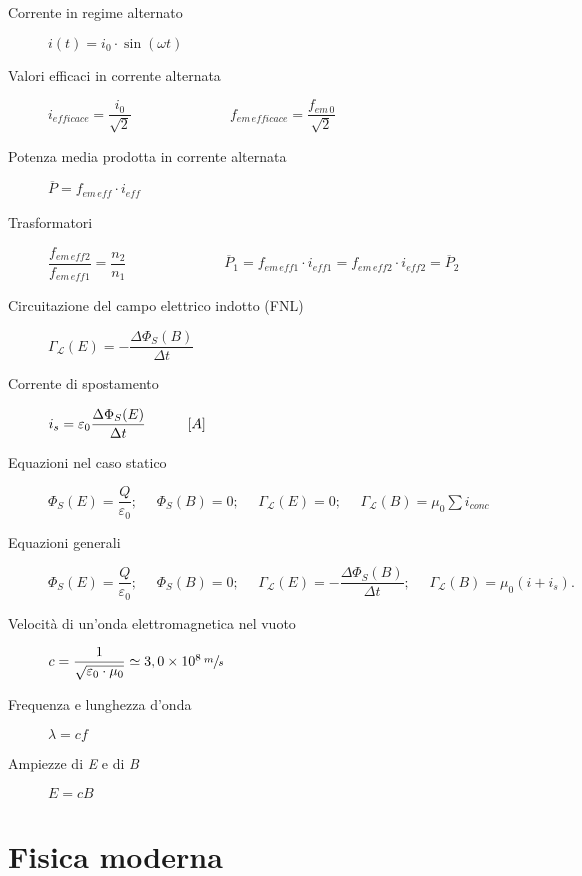 \documentclass[a4paper,11pt,italian]{article}
\begin{document}
\begin{description}
  \item[Corrente in regime alternato]
  $ i (t)  = i_0 \cdot \sin (\omega t) $
  
  \item[Valori efficaci in corrente alternata]  $ i_{\mathit{efficace}} = \dfrac{i_0}{\sqrt{2}} $~~~~~~~~~~~~~~$ f_{em \, \mathit{efficace}} = \dfrac{f_{em \, 0}}{\sqrt{2}} $
  
  \item[Potenza media prodotta in corrente alternata] 
  $ \overline{P} = f_{em \, \mathit{eff}} \cdot i_{\mathit{eff}} $
  
  \item[Trasformatori] $ \dfrac{f_{em \, \mathit{eff}2}}{f_{em \, \mathit{eff}1}} = \dfrac{n_2}{n_1} $~~~~~~~~~~~~~~$ \overline{P}_1 = f_{em \, \mathit{eff}1} \cdot i_{\mathit{eff}1} =  f_{em \, \mathit{eff}2} \cdot i_{\mathit{eff}2} = \overline{P}_2 $

  \item[Circuitazione del campo elettrico indotto (FNL)] 
  $ \Gamma_\mathscr{L}(E) = - \dfrac{\Delta \Phi_S(B)}{\Delta t}  $
  
  \item[Corrente di spostamento] 
  $ i_s = \varepsilon_0 \dfrac{\Delta \Phi_S(E)}{\Delta t} \hspace*{3em} [A]$
  
  \item[Equazioni nel caso statico] $ \Phi_S(E) = \dfrac{Q}{\varepsilon_0}; ~~~~~~ \Phi_S(B) = 0; ~~~~~~ \Gamma_\mathscr{L}(E) = 0; ~~~~~~ \Gamma_\mathscr{L}(B) = \mu_0 \sum i_{conc}$
  \item[Equazioni generali] $ \Phi_S(E) = \dfrac{Q}{\varepsilon_0}; ~~~~~~ \Phi_S(B) = 0; ~~~~~~ \Gamma_\mathscr{L}(E) = - \dfrac{\Delta\Phi_S(B)}{\Delta t}; ~~~~~~ \Gamma_\mathscr{L}(B) = \mu_0 \left( i + i_s \right) .$
  
  
  \item[Velocità di un'onda elettromagnetica nel vuoto] 
  $ c = \dfrac{1}{\sqrt{\varepsilon_0\cdot \mu_0}} \simeq 3,0 \times 10^8 \,	\sfrac{m}{s} $
  
   \item[Frequenza e lunghezza d'onda] 
$ \lambda = c f $
  
    \item[Ampiezze di \textit{E} e di \textit{B}] $ E = cB $
\end{description}
   
\section{Fisica moderna}
\end{document}
